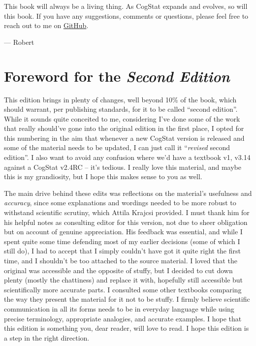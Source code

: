 \documentclass[
  11pt,
]{book}
\theoremstyle{definition}
\theoremstyle{definition}
\theoremstyle{definition}
\theoremstyle{definition}
\theoremstyle{remark}
\begin{document}
This book will always be a living thing. As CogStat expands and evolves, so will this book. If you have any suggestions, comments or questions, please feel free to reach out to me on \href{https://github.com/robertfodor/lsc/issues}{GitHub}.

\nopagebreak[4]

--- Robert

\hypertarget{foreword-for-the-second-edition}{%
\section*{\texorpdfstring{Foreword for the \emph{Second Edition}}{Foreword for the Second Edition}}\label{foreword-for-the-second-edition}}

This edition brings in plenty of changes, well beyond 10\% of the book, which should warrant, per publishing standards, for it to be called ``second edition''. While it sounds quite conceited to me, considering I've done some of the work that really should've gone into the original edition in the first place, I opted for this numbering in the aim that whenever a new CogStat version is released and some of the material needs to be updated, I can just call it ``\emph{revised} second edition''. I also want to avoid any confusion where we'd have a textbook v1, v3.14 against a CogStat v2.4RC -- it's tedious. I really love this material, and maybe this is my grandiosity, but I hope this makes sense to you as well.

The main drive behind these edits was reflections on the material's usefulness and \emph{accuracy}, since some explanations and wordings needed to be more robust to withstand scientific scrutiny, which Attila Krajcsi provided. I must thank him for his helpful notes as consulting editor for this version, not due to sheer obligation but on account of genuine appreciation. His feedback was essential, and while I spent quite some time defending most of my earlier decisions (some of which I still do), I had to accept that I simply couldn't have got it quite right the first time, and I shouldn't be too attached to the source material. I loved that the original was accessible and the opposite of stuffy, but I decided to cut down plenty (mostly the chattiness) and replace it with, hopefully still accessible but scientifically more accurate parts. I consulted some other textbooks comparing the way they present the material for it not to be stuffy. I firmly believe scientific communication in all its forms needs to be in everyday language while using precise terminology, appropriate analogies, and accurate examples. I hope that this edition is something you, dear reader, will love to read. I hope this edition is a step in the right direction.
\end{document}
